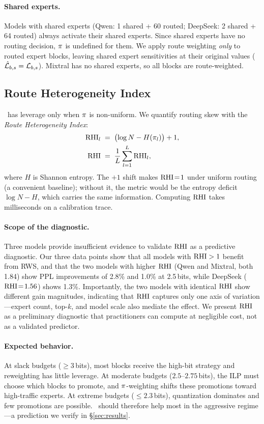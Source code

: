 \paragraph{Shared experts.}
Models with shared experts (Qwen: 1 shared + 60 routed; DeepSeek: 2 shared + 64 routed) always activate their shared experts. Since shared experts have no routing decision, $\pi$ is undefined for them. We apply route weighting \emph{only} to routed expert blocks, leaving shared expert sensitivities at their original values ($\hat{\mathcal{L}}_{b,s} = \mathcal{L}_{b,s}$). Mixtral has no shared experts, so all blocks are route-weighted.

\subsection{Route Heterogeneity Index}
\label{sec:rhi}

\method\ has leverage only when $\pi$ is non-uniform. We quantify routing skew with the \emph{Route Heterogeneity Index}:
\begin{align}
\label{eq:rhi}
  \mathrm{RHI}_l &\;=\; \bigl(\log N - H(\pi_l)\bigr) + 1, \\
  \mathrm{RHI}   &\;=\; \frac{1}{L}\sum_{l=1}^{L} \mathrm{RHI}_l,
\end{align}
where $H$ is Shannon entropy. The $+1$ shift makes $\mathrm{RHI}\!=\!1$ under uniform routing (a convenient baseline); without it, the metric would be the entropy deficit $\log N - H$, which carries the same information. Computing $\mathrm{RHI}$ takes milliseconds on a calibration trace.

\paragraph{Scope of the diagnostic.}
Three models provide insufficient evidence to validate $\mathrm{RHI}$ as a predictive diagnostic. Our three data points show that all models with $\mathrm{RHI} > 1$ benefit from RWS, and that the two models with higher $\mathrm{RHI}$ (Qwen and Mixtral, both 1.84) show PPL improvements of 2.8\% and 1.0\% at 2.5\,bits, while DeepSeek ($\mathrm{RHI}\!=\!1.56$) shows 1.3\%. Importantly, the two models with identical $\mathrm{RHI}$ show different gain magnitudes, indicating that $\mathrm{RHI}$ captures only one axis of variation---expert count, top-$k$, and model scale also mediate the effect. We present $\mathrm{RHI}$ as a preliminary diagnostic that practitioners can compute at negligible cost, not as a validated predictor.

\paragraph{Expected behavior.}
At slack budgets ($\ge\!3$\,bits), most blocks receive the high-bit strategy and reweighting has little leverage. At moderate budgets ($2.5$--$2.75$\,bits), the ILP must choose which blocks to promote, and $\pi$-weighting shifts these promotions toward high-traffic experts. At extreme budgets ($\le\!2.3$\,bits), quantization dominates and few promotions are possible. \method\ should therefore help most in the aggressive regime---a prediction we verify in \S\ref{sec:results}.
